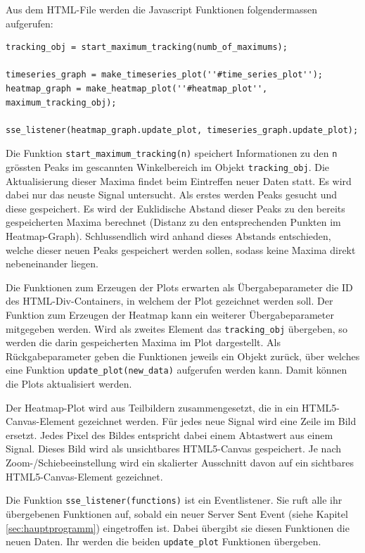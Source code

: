 Aus dem HTML-File werden die Javascript Funktionen folgendermassen aufgerufen:

\begin{lstlisting}[frame=single]
tracking_obj = start_maximum_tracking(numb_of_maximums);

timeseries_graph = make_timeseries_plot(''#time_series_plot'');
heatmap_graph = make_heatmap_plot(''#heatmap_plot'', maximum_tracking_obj);

sse_listener(heatmap_graph.update_plot, timeseries_graph.update_plot);
\end{lstlisting}

Die Funktion \texttt{start\_maximum\_tracking(n)} speichert Informationen zu den \texttt{n} grössten Peaks im gescannten Winkelbereich im Objekt \texttt{tracking\_obj}.
Die Aktualisierung dieser Maxima findet beim Eintreffen neuer Daten statt. Es wird dabei nur das neuste Signal untersucht. Als erstes werden Peaks gesucht und diese gespeichert. Es wird der Euklidische Abstand dieser Peaks zu den bereits gespeicherten Maxima berechnet (Distanz zu den entsprechenden Punkten im Heatmap-Graph). Schlussendlich wird anhand dieses Abstands entschieden, welche dieser neuen Peaks gespeichert werden sollen, sodass keine Maxima direkt nebeneinander liegen.

Die Funktionen zum Erzeugen der Plots erwarten als Übergabeparameter die ID des HTML-Div-Containers, in welchem der Plot gezeichnet werden soll. Der Funktion zum Erzeugen der Heatmap kann ein weiterer Übergabeparameter mitgegeben werden. Wird als zweites Element das \texttt{tracking\_obj} übergeben, so werden die darin gespeicherten Maxima im Plot dargestellt.
Als Rückgabeparameter geben die Funktionen jeweils ein Objekt zurück, über welches eine Funktion \texttt{update\_plot(new\_data)} aufgerufen werden kann. Damit können die Plots aktualisiert werden.

Der Heatmap-Plot wird aus Teilbildern zusammengesetzt, die in ein HTML5-Canvas-Element gezeichnet werden. Für jedes neue Signal wird eine Zeile im Bild ersetzt. Jedes Pixel des Bildes entspricht dabei einem Abtastwert aus einem Signal. Dieses Bild wird als unsichtbares HTML5-Canvas gespeichert. Je nach Zoom-/Schiebeeinstellung wird ein skalierter Ausschnitt davon auf ein sichtbares HTML5-Canvas-Element gezeichnet.

Die Funktion \texttt{sse\_listener(functions)} ist ein Eventlistener. Sie ruft alle ihr übergebenen Funktionen auf, sobald ein neuer Server Sent Event (siehe Kapitel \ref{sec:hauptprogramm}) eingetroffen ist. Dabei übergibt sie diesen Funktionen die neuen Daten. Ihr werden die beiden \texttt{update\_plot} Funktionen übergeben.



